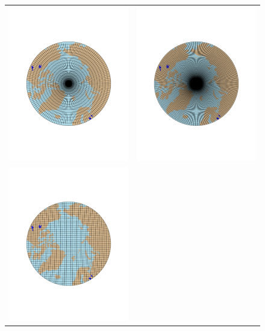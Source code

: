 \documentclass[draft]{agujournal2019}
\begin{document}
\begin{figure}[t]
\begin{center}
\begin{tabular}{cc}
         \includegraphics[width=60mm]{figs/grid-f19.pdf}&
         \includegraphics[width=60mm]{figs/grid-f09.pdf}\\
         \includegraphics[width=60mm]{figs/grid-ne30pg2.pdf}&

\end{tabular}
\end{center}
\end{figure}
\end{document}
